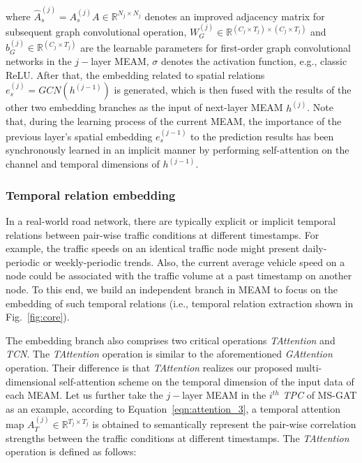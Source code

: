where $\hat{A}_s^{(j)}=A_s^{(j)} A \in \mathbb{R}^{N_j \times N_j}$ denotes an improved adjacency matrix for subsequent graph convolutional operation, $W_G^{(j)} \in \mathbb{R}^{(C_j \times T_j) \times (C_j \times T_j)}$ and $b_G^{(j)}  \in \mathbb{R}^{(C_j \times T_j)}$ are the learnable parameters for first-order graph convolutional networks \cite{kipf2016semi} in the $j-$layer MEAM, $\sigma$ denotes the activation function, e.g., classic ReLU. After that, the embedding related to spatial relations $e_s^{(j)}=GCN(h^{(j-1)})$ is generated, which is then fused with the results of the other two embedding branches as the input of next-layer MEAM $h^{(j)}$. Note that, during the learning process of the current MEAM, the importance of the previous layer's spatial embedding $e_s^{(j-1)}$ to the prediction results has been synchronously learned in an implicit manner by performing self-attention on the channel and temporal dimensions of $h^{(j-1)}$.

\subsubsection{Temporal relation embedding}
In a real-world road network, there are typically explicit or implicit temporal relations between pair-wise traffic conditions at different timestamps. For example, the traffic speeds on an identical traffic node might present daily-periodic or weekly-periodic trends. Also, the current average vehicle speed on a node could be associated with the traffic volume at a past timestamp on another node. To this end, we build an independent branch in MEAM to focus on the embedding of such temporal relations (i.e., temporal relation extraction shown in Fig.~\ref{fig:core}).

The embedding branch also comprises two critical operations \textit{TAttention} and \textit{TCN}. The \textit{TAttention} operation is similar to the aforementioned \textit{GAttention} operation. Their difference is that  \textit{TAttention}  realizes our proposed multi-dimensional self-attention scheme on the temporal dimension of the input data of each MEAM. Let us further take the $j-$layer MEAM in the $i^{th}$ \textit{TPC} of MS-GAT as an example, according to Equation~\ref{eqn:attention_3}, a temporal attention map $A_T^{(j)} \in \mathbb{R}^{T_j \times T_j}$ is obtained to semantically represent the pair-wise correlation strengths between the traffic conditions at different timestamps. The \textit{TAttention} operation is defined as follows:

